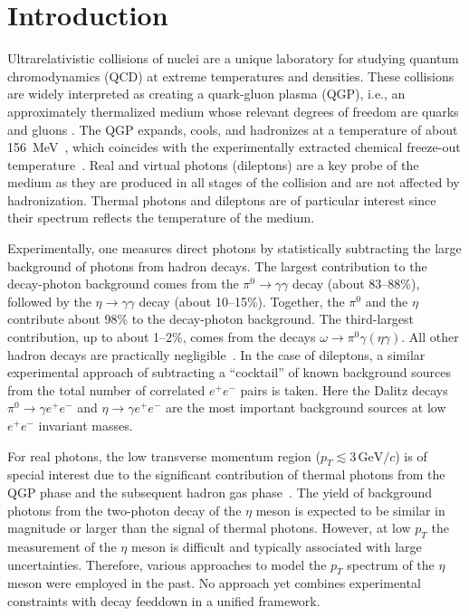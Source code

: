 \documentclass[%
 reprint,
 amsmath,amssymb,
 aps,
prc,
]{revtex4-2}
\begin{document}
\section{Introduction}
Ultrarelativistic collisions of nuclei are a unique laboratory for studying quantum chromodynamics (QCD) at extreme temperatures and densities. These collisions are widely interpreted as creating a quark-gluon plasma (QGP), i.e., an approximately thermalized medium whose relevant degrees of freedom are quarks and gluons \cite{Busza:2018rrf}. The QGP expands, cools, and hadronizes at a temperature of about 156~MeV~\cite{Borsanyi:2018grb,HotQCD:2018pds}, which coincides with the experimentally extracted chemical freeze-out temperature~\cite{Andronic:2017pug}. Real and virtual photons (dileptons) are a key probe of the medium as they are produced in all stages of the collision and are not affected by hadronization. Thermal photons and dileptons are of particular interest since their spectrum reflects the temperature of the medium. 

Experimentally, one measures direct photons by statistically subtracting the large background of photons from hadron decays. The largest contribution to the decay-photon background comes from the $\pi^0 \to \gamma \gamma$ decay (about 83--88\%), followed by the $\eta \to \gamma \gamma$ decay (about 10--15\%). Together, the $\pi^0$ and the $\eta$ contribute about 98\% to the decay-photon background. The third-largest contribution, up to about 1--2\%, comes from the decays $\omega \to \pi^0 \gamma (\eta \gamma)$. All other hadron decays are practically negligible~\cite{ALICE:2015xmh}. In the case of dileptons, a similar experimental approach of subtracting a ``cocktail'' of known background sources from the total number of correlated $e^+e^-$ pairs is taken. Here the Dalitz decays $\pi^0 \to \gamma e^+e^-$ and $\eta \to \gamma e^+e^-$ are the most important background sources at low $e^+e^-$ invariant masses.

For real photons, the low transverse momentum region ($p_T \lesssim 3\,\mathrm{GeV}/c$) is of special interest due to the significant contribution of thermal photons from the QGP phase and the subsequent hadron gas phase~\cite{David:2019wpt}. The yield of background photons from the two-photon decay of the $\eta$ meson is expected to be similar in magnitude or larger than the signal of thermal photons. However, at low $p_T$ the measurement of the $\eta$ meson is difficult and typically associated with large uncertainties. Therefore, various approaches to model the $p_T$ spectrum of the $\eta$ meson were employed in the past. No approach yet combines experimental constraints with decay feeddown in a unified framework.
\end{document}
